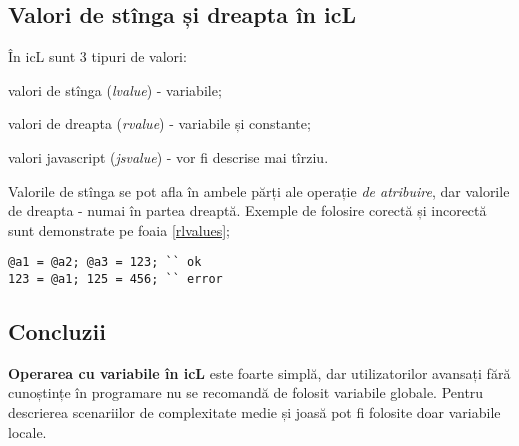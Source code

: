 \subsection{Valori de stînga și dreapta în icL}

În icL sunt 3 tipuri de valori:

\begin{icEnum}
\item
	valori de stînga ({\it lvalue}) - variabile;
\item
	valori de dreapta ({\it rvalue}) - variabile și constante;
\item
	valori javascript ({\it jsvalue}) - vor fi descrise mai tîrziu.
\end{icEnum}

Valorile de stînga se pot afla în ambele părți ale operație {\it de atribuire}, dar valorile de dreapta - numai în partea dreaptă. Exemple de folosire corectă și incorectă sunt demonstrate pe foaia \ref{rlvalues};

\begin{lstlisting}[caption=Valori de stînga și dreapta, label=rlvalues]
@a1 = @a2; @a3 = 123; `` ok
123 = @a1; 125 = 456; `` error
\end{lstlisting}

\subsection{Concluzii}

{\bf Operarea cu variabile în icL} este foarte simplă, dar utilizatorilor avansați fără cunoștințe în programare nu se recomandă de folosit variabile globale. Pentru descrierea scenariilor de complexitate medie și joasă pot fi folosite doar variabile locale.
